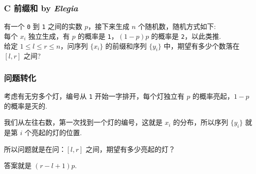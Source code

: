 \frame
{
  \frametitle{C 前缀和 {by \itshape Elegia}}

  有一个 \texttt{0} 到 \texttt{1} 之间的实数 $p$，接下来生成 $n$ 个随机数，随机方式如下:\\
  每个 $x_i$ 独立生成，有 $p$ 的概率是 \texttt{1}，$(1-p)p$ 的概率是 \texttt{2}，以此类推.\\
  给定 $1\le l\le r\le n$，问序列 $\{x_i\}$ 的前缀和序列 $\{y_i\}$ 中，期望有多少个数落在 $[l, r]$ 之间?

}


\frame
{
    \frametitle{问题转化}

	考虑有无穷多个灯，编号从 \texttt{1} 开始一字排开，每个灯独立有 $p$ 的概率亮起，$1-p$ 的概率是灭的. \pause

	我们从左往右数，第一次找到一个灯的编号，这就是 $x_i$ 的分布，所以序列 $\{y_i\}$ 就是第 $i$ 个亮起的灯的位置. \pause

	所以问题就是在问：$[l, r]$ 之间，期望有多少亮起的灯？\pause

   	答案就是 $(r-l+1)p$.
}
